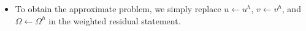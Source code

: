 \begin{frame}%
  \begin{itemize}




  \item{To obtain the approximate problem, we simply
    replace $u \leftarrow u^h$, $v \leftarrow v^h$, and $\Omega \leftarrow \Omega^h$
    in the weighted residual
    statement.}
    
  \end{itemize}
\end{frame}
